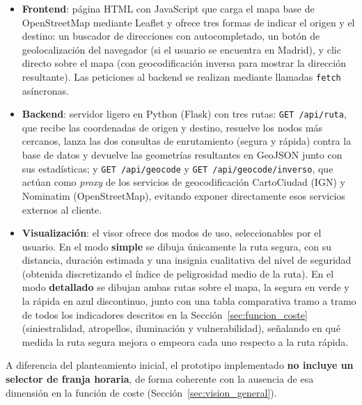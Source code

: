 \begin{itemize}
    \item \textbf{Frontend}: página HTML con JavaScript que carga el mapa base de OpenStreetMap mediante Leaflet y ofrece tres formas de indicar el origen y el destino: un buscador de direcciones con autocompletado, un botón de geolocalización del navegador (si el usuario se encuentra en Madrid), y clic directo sobre el mapa (con geocodificación inversa para mostrar la dirección resultante). Las peticiones al backend se realizan mediante llamadas \texttt{fetch} asíncronas.
    \item \textbf{Backend}: servidor ligero en Python (Flask) con tres rutas: \texttt{GET /api/ruta}, que recibe las coordenadas de origen y destino, resuelve los nodos más cercanos, lanza las dos consultas de enrutamiento (segura y rápida) contra la base de datos y devuelve las geometrías resultantes en GeoJSON junto con sus estadísticas; y \texttt{GET /api/geocode} y \texttt{GET /api/geocode/inverso}, que actúan como \textit{proxy} de los servicios de geocodificación CartoCiudad (IGN) y Nominatim (OpenStreetMap), evitando exponer directamente esos servicios externos al cliente.
    \item \textbf{Visualización}: el visor ofrece dos modos de uso, seleccionables por el usuario. En el modo \textbf{simple} se dibuja únicamente la ruta segura, con su distancia, duración estimada y una insignia cualitativa del nivel de seguridad (obtenida discretizando el índice de peligrosidad medio de la ruta). En el modo \textbf{detallado} se dibujan ambas rutas sobre el mapa, la segura en verde y la rápida en azul discontinuo, junto con una tabla comparativa tramo a tramo de todos los indicadores descritos en la Sección~\ref{sec:funcion_coste} (siniestralidad, atropellos, iluminación y vulnerabilidad), señalando en qué medida la ruta segura mejora o empeora cada uno respecto a la ruta rápida.
\end{itemize}

A diferencia del planteamiento inicial, el prototipo implementado \textbf{no incluye un selector de franja horaria}, de forma coherente con la ausencia de esa dimensión en la función de coste (Sección~\ref{sec:vision_general}).